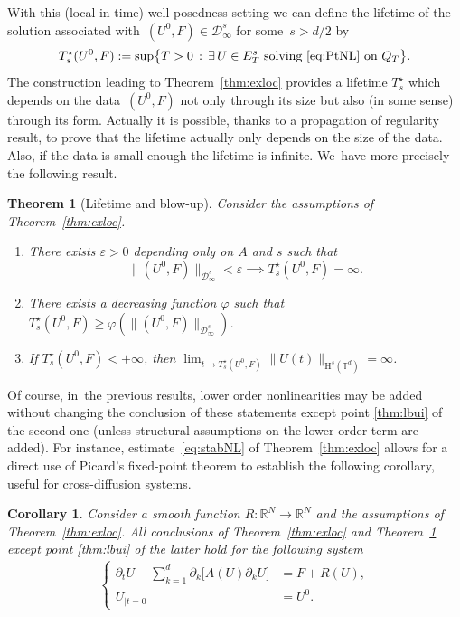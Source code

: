\documentclass[JEP,XML,SOM,Unicode,published]{cedram}
\newenvironment{enumeratei}
{\bgroup\def\theenumi{\roman{enumi}}\def\theenumii{\arabic{enumii}}\begin{enumerate}}
{\end{enumerate}\egroup}
\newtheorem{thm}{Theorem}
\newtheorem{coro}[prop]{Corollary}
\theoremstyle{definition}
\newcommand\R{\mathbb{R}}
\newcommand\T{\mathbb{T}}
\renewcommand\H{\mathrm{H}}
\let\ep\varepsilon
\let\ffi\varphi
\begin{document}
With this (local in time) well-posedness setting we can define the lifetime of the solution associated with~$(U^0,F)\in \mathcal D_\infty^s$ for some~$s>d/2$ by
\[
T^\star_s(U^0,F):= \sup \bigl\{T>0\,:\, \exists\, U \in E_T^s\textnormal{ solving \eqref{eq:PtNL} on } Q_T\bigr\}.
\]
The construction leading to Theorem~\ref{thm:exloc} provides a lifetime $T^\star_s$ which depends on the data~$(U^0,F)$ not only through its size but also (in some sense) through its form. Actually
it is possible, thanks to a propagation of regularity result, to prove that the lifetime actually only depends on the size of the data.
Also, if the data is small enough the lifetime is infinite. We~have more precisely the following result.

\begin{thm}[Lifetime and blow-up] \label{thm:lbu}
Consider the assumptions of Theorem~\ref{thm:exloc}.
\begin{enumeratei}
\item\label{thm:lbui}
There exists $\ep>0$ depending only on $A$ and $s$ such that
\[
\|(U^0,F)\|_{ \mathcal D_\infty^s} < \ep \implies T_s^\star(U^0,F) = \infty.
\]

\item\label{thm:lbuii}
There exists a decreasing function $\ffi$ such that $T^\star_s(U^0,F) \geq \ffi(\|(U^0,F)\|_{ \mathcal D_\infty^s})$.

\item\label{thm:lbuiii}
If $T^\star_s(U^0,F)<+\infty$, then $\lim_{t\to T^\star_s(U^0,F)}\|U(t)\|_{\H^s(\T^d)} = \infty$.
\end{enumeratei}
\end{thm}
{Of course, in~the previous results, lower order nonlinearities may be added without changing the conclusion of these statements except point \eqref{thm:lbui} of the second one (unless structural assumptions on the lower order term are added). For instance, estimate~\eqref{eq:stabNL} of Theorem~\ref{thm:exloc} allows for a direct use of Picard's fixed-point theorem to establish the following corollary, useful for cross-diffusion systems.}

\begin{coro}\label{coro:reac}
Consider a smooth function $R:\R^N\to\R^N$ and the assumptions of Theorem~\ref{thm:exloc}. All conclusions of Theorem~\ref{thm:exloc} and Theorem~\ref{thm:lbu} except point \eqref{thm:lbui} of the latter hold for the following system
\begin{align}
\label{eq:PtNL:reac}
\left\{
\begin{aligned}
\partial_t U-\sum_{k=1}^d\partial_k \bigl[A(U)\partial_k U\bigr] &= F+R(U),\\
U_{|t=0} &= U^0.
\end{aligned}
\right.
\end{align}
\end{coro}
\end{document}
